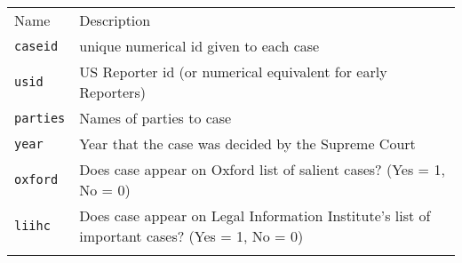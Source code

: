\documentclass[]{article}
\begin{document}
\begin{longtable}[c]{@{}ll@{}}
\toprule\addlinespace
\begin{minipage}[b]{0.25\columnwidth}\raggedright
Name
\end{minipage} & \begin{minipage}[b]{0.68\columnwidth}\raggedright
Description
\end{minipage}
\\\addlinespace
\midrule\endhead
\begin{minipage}[t]{0.25\columnwidth}\raggedright
\texttt{caseid}
\end{minipage} & \begin{minipage}[t]{0.68\columnwidth}\raggedright
unique numerical id given to each case
\end{minipage}
\\\addlinespace
\begin{minipage}[t]{0.25\columnwidth}\raggedright
\texttt{usid}
\end{minipage} & \begin{minipage}[t]{0.68\columnwidth}\raggedright
US Reporter id (or numerical equivalent for early Reporters)
\end{minipage}
\\\addlinespace
\begin{minipage}[t]{0.25\columnwidth}\raggedright
\texttt{parties}
\end{minipage} & \begin{minipage}[t]{0.68\columnwidth}\raggedright
Names of parties to case
\end{minipage}
\\\addlinespace
\begin{minipage}[t]{0.25\columnwidth}\raggedright
\texttt{year}
\end{minipage} & \begin{minipage}[t]{0.68\columnwidth}\raggedright
Year that the case was decided by the Supreme Court
\end{minipage}
\\\addlinespace
\begin{minipage}[t]{0.25\columnwidth}\raggedright
\texttt{oxford}
\end{minipage} & \begin{minipage}[t]{0.68\columnwidth}\raggedright
Does case appear on Oxford list of salient cases? (Yes = 1, No = 0)
\end{minipage}
\\\addlinespace
\begin{minipage}[t]{0.25\columnwidth}\raggedright
\texttt{liihc}
\end{minipage} & \begin{minipage}[t]{0.68\columnwidth}\raggedright
Does case appear on Legal Information Institute's list of important
cases? (Yes = 1, No = 0)
\end{minipage}
\\\addlinespace
\bottomrule
\end{longtable}
\end{document}
